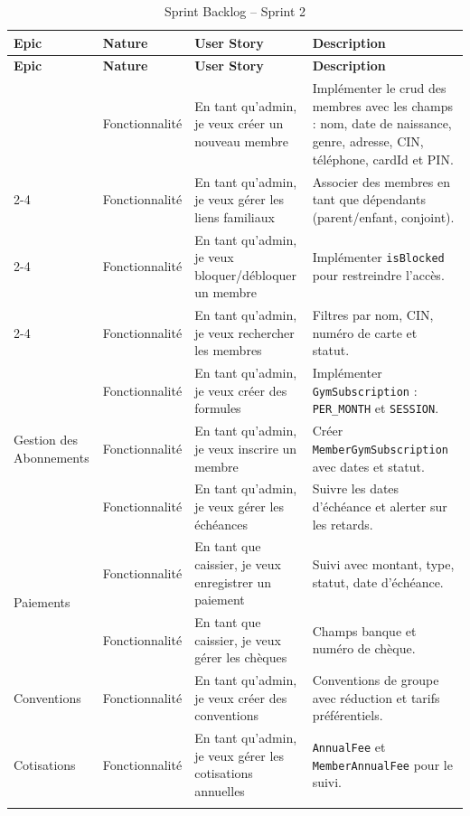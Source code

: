 ﻿\documentclass[../main.tex]{subfiles}
\begin{document}
\begin{longtable}{|p{3cm}|p{2.5cm}|p{4cm}|p{5cm}|}
\hline
\textbf{Epic} & \textbf{Nature} & \textbf{User Story} & \textbf{Description} \\
\hline
\endfirsthead
\hline
\textbf{Epic} & \textbf{Nature} & \textbf{User Story} & \textbf{Description} \\
\hline
\endhead
\hline
\endfoot

\multirow{4}{3cm}{Gestion des Membres} & Fonctionnalit\'{e} & En tant qu'admin, je veux cr\'{e}er un nouveau membre & Impl\'{e}menter le \acrshort{crud} des membres avec les champs : nom, date de naissance, genre, adresse, CIN, t\'{e}l\'{e}phone, cardId et PIN. \\
\cline{2-4}
& Fonctionnalit\'{e} & En tant qu'admin, je veux g\'{e}rer les liens familiaux & Associer des membres en tant que d\'{e}pendants (parent/enfant, conjoint). \\
\cline{2-4}
& Fonctionnalit\'{e} & En tant qu'admin, je veux bloquer/d\'{e}bloquer un membre & Impl\'{e}menter \texttt{isBlocked} pour restreindre l'acc\`{e}s. \\
\cline{2-4}
& Fonctionnalit\'{e} & En tant qu'admin, je veux rechercher les membres & Filtres par nom, CIN, num\'{e}ro de carte et statut. \\
\hline

\multirow{3}{3cm}{Gestion des Abonnements} & Fonctionnalit\'{e} & En tant qu'admin, je veux cr\'{e}er des formules & Impl\'{e}menter \texttt{GymSubscription} : \texttt{PER\_MONTH} et \texttt{SESSION}. \\
\cline{2-4}
& Fonctionnalit\'{e} & En tant qu'admin, je veux inscrire un membre & Cr\'{e}er \texttt{MemberGymSubscription} avec dates et statut. \\
\cline{2-4}
& Fonctionnalit\'{e} & En tant qu'admin, je veux g\'{e}rer les \'{e}ch\'{e}ances & Suivre les dates d'\'{e}ch\'{e}ance et alerter sur les retards. \\
\hline

\multirow{2}{3cm}{Paiements} & Fonctionnalit\'{e} & En tant que caissier, je veux enregistrer un paiement & Suivi avec montant, type, statut, date d'\'{e}ch\'{e}ance. \\
\cline{2-4}
& Fonctionnalit\'{e} & En tant que caissier, je veux g\'{e}rer les ch\`{e}ques & Champs banque et num\'{e}ro de ch\`{e}que. \\
\hline

Conventions & Fonctionnalit\'{e} & En tant qu'admin, je veux cr\'{e}er des conventions & Conventions de groupe avec r\'{e}duction et tarifs pr\'{e}f\'{e}rentiels. \\
\hline

Cotisations & Fonctionnalit\'{e} & En tant qu'admin, je veux g\'{e}rer les cotisations annuelles & \texttt{AnnualFee} et \texttt{MemberAnnualFee} pour le suivi. \\
\hline

\caption{Sprint Backlog -- Sprint 2}
\label{tab:sprint2-backlog}
\end{longtable}
\end{document}
